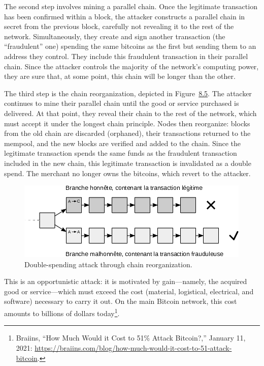 \documentclass[
  a5paper,
  smalldemyvopaper,10pt,twoside,onecolumn,openright,extrafontsizes,hidelinks]{memoir}
\begin{document}
The second step involves mining a parallel chain. Once the legitimate
transaction has been confirmed within a block, the attacker constructs a
parallel chain in secret from the previous block, carefully not
revealing it to the rest of the network. Simultaneously, they create and
sign another transaction (the ``fraudulent'' one) spending the same
bitcoins as the first but sending them to an address they control. They
include this fraudulent transaction in their parallel chain. Since the
attacker controls the majority of the network's computing power, they
are sure that, at some point, this chain will be longer than the other.

The third step is the chain reorganization, depicted in
Figure~\hyperref[fig:doublespending-attack]{8.5}. The attacker continues
to mine their parallel chain until the good or service purchased is
delivered. At that point, they reveal their chain to the rest of the
network, which must accept it under the longest chain principle. Nodes
then reorganize: blocks from the old chain are discarded (orphaned),
their transactions returned to the mempool, and the new blocks are
verified and added to the chain. Since the legitimate transaction spends
the same funds as the fraudulent transaction included in the new chain,
this legitimate transaction is invalidated as a double spend. The
merchant no longer owns the bitcoins, which revert to the attacker.

\begin{figure}

{\centering \includegraphics{chapters/img/mining-attack-doublespending.png}

}

\caption{Double-spending attack through chain reorganization.}

\end{figure}%

This is an opportunistic attack: it is motivated by gain---namely, the
acquired good or service---which must exceed the cost (material,
logistical, electrical, and software) necessary to carry it out. On the
main Bitcoin network, this cost amounts to billions of dollars
today\footnote{Braiins, ``How Much Would it Cost to 51\% Attack
  Bitcoin?,'' January 11, 2021:
  \url{https://braiins.com/blog/how-much-would-it-cost-to-51-attack-bitcoin}.}.
\end{document}
